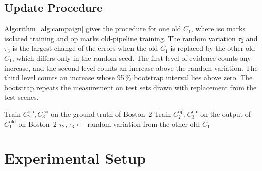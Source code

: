 \documentclass[conference]{IEEEtran}
\begin{document}
\subsection{Update Procedure}
Algorithm~\ref{alg:campaign} gives the procedure for one old $C_1$, where iso marks isolated training and op marks old-pipeline training. The random
variation $\tau_2$ and $\tau_3$ is the largest change of the errors when the
old $C_1$ is replaced by the other old $C_1$, which differs only in the random
seed. The first level of evidence counts any increase, and the second level
counts an increase above the random variation. The third level counts an
increase whose 95\,\% bootstrap interval lies above zero. The bootstrap
repeats the measurement on test sets drawn with replacement from the test
scenes.

\begin{algorithm}[t]
\footnotesize
\DontPrintSemicolon
{}
Train $C_2^{\mathrm{iso}}, C_3^{\mathrm{iso}}$ on the ground truth of Boston~2\;
Train $C_2^{\mathrm{op}}, C_3^{\mathrm{op}}$ on the output of $C_1^{\mathrm{old}}$ on Boston~2\;
$\tau_2, \tau_3 \leftarrow$ random variation from the other old $C_1$\;
\caption{Update procedure for one old $C_1$}
\label{alg:campaign}
\end{algorithm}

\section{Experimental Setup}
\end{document}
